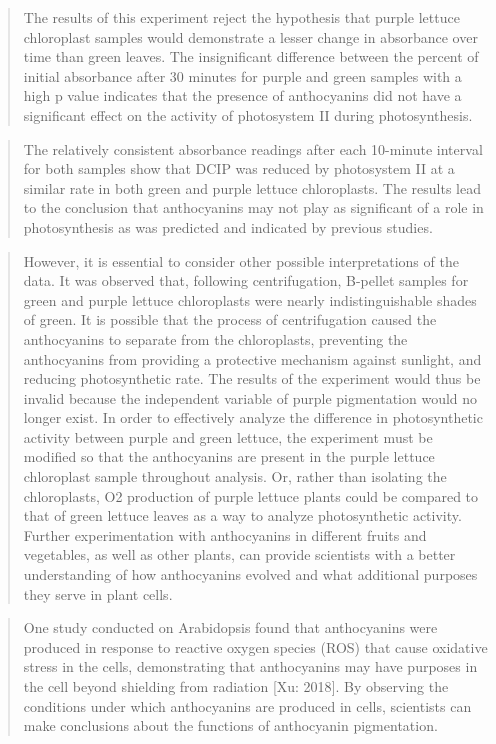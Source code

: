 \documentclass[
]{book}
\begin{document}
\begin{quote}
The results of this experiment reject the hypothesis that purple lettuce chloroplast samples would demonstrate a lesser change in absorbance over time than green leaves. The insignificant difference between the percent of initial absorbance after 30 minutes for purple and green samples with a high p value indicates that the presence of anthocyanins did not have a significant effect on the activity of photosystem II during photosynthesis.
\end{quote}

\begin{quote}
The relatively consistent absorbance readings after each 10-minute interval for both samples show that DCIP was reduced by photosystem II at a similar rate in both green and purple lettuce chloroplasts. The results lead to the conclusion that anthocyanins may not play as significant of a role in photosynthesis as was predicted and indicated by previous studies.
\end{quote}

\begin{quote}
However, it is essential to consider other possible interpretations of the data. It was observed that, following centrifugation, B-pellet samples for green and purple lettuce chloroplasts were nearly indistinguishable shades of green. It is possible that the process of centrifugation caused the anthocyanins to separate from the chloroplasts, preventing the anthocyanins from providing a protective mechanism against sunlight, and reducing photosynthetic rate. The results of the experiment would thus be invalid because the independent variable of purple pigmentation would no longer exist. In order to effectively analyze the difference in photosynthetic activity between purple and green lettuce, the experiment must be modified so that the anthocyanins are present in the purple lettuce chloroplast sample throughout analysis. Or, rather than isolating the chloroplasts, O2 production of purple lettuce plants could be compared to that of green lettuce leaves as a way to analyze photosynthetic activity. Further experimentation with anthocyanins in different fruits and vegetables, as well as other plants, can provide scientists with a better understanding of how anthocyanins evolved and what additional purposes they serve in plant cells.
\end{quote}

\begin{quote}
One study conducted on Arabidopsis found that anthocyanins were produced in response to reactive oxygen species (ROS) that cause oxidative stress in the cells, demonstrating that anthocyanins may have purposes in the cell beyond shielding from radiation {[}Xu: 2018{]}. By observing the conditions under which anthocyanins are produced in cells, scientists can make conclusions about the functions of anthocyanin pigmentation.
\end{quote}
\end{document}
